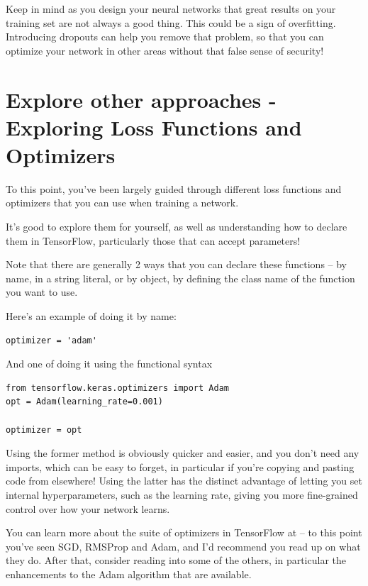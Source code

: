 Keep in mind as you design your neural networks that great results on your training set are not always a good thing. This could be a sign of overfitting. Introducing dropouts can help you remove that problem, so that you can optimize your network in other areas without that false sense of security!


\section{Explore other approaches - Exploring Loss Functions and Optimizers}

To this point, you’ve been largely guided through different loss functions and optimizers that you can use when training a network.

It’s good to explore them for yourself, as well as understanding how to declare them in TensorFlow, particularly those that can accept parameters!

Note that there are generally 2 ways that you can declare these functions -- by name, in a string literal, or by object, by defining the class name of the function you want to use.

Here’s an example of doing it by name:

\begin{lstlisting}
optimizer = 'adam'
\end{lstlisting}

And one of doing it using the functional syntax

\begin{lstlisting}
from tensorflow.keras.optimizers import Adam
opt = Adam(learning_rate=0.001)

optimizer = opt
\end{lstlisting}

Using the former method is obviously quicker and easier, and you don’t need any imports, which can be easy to forget, in particular if you’re copying and pasting code from elsewhere! Using the latter has the distinct advantage of letting you set internal hyperparameters, such as the learning rate, giving you more fine-grained control over how your network learns.

You can learn more about the suite of optimizers in TensorFlow at  -- to this point you’ve seen SGD, RMSProp and Adam, and I’d recommend you read up on what they do. After that, consider reading into some of the others, in particular the enhancements to the Adam algorithm that are available.

